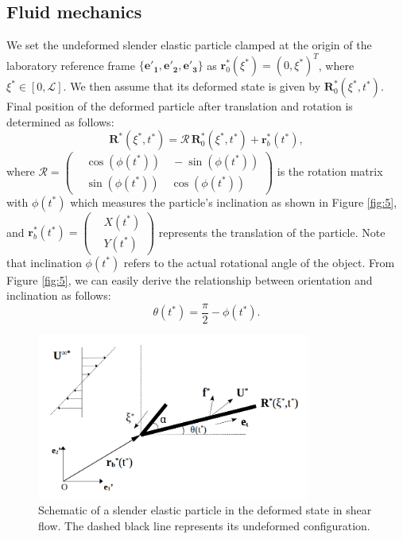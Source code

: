 \documentclass[a4paper,12pt]{report}
\begin{document}
\subsection{Fluid mechanics}
We set the undeformed slender elastic particle clamped at the origin of the laboratory reference frame $\{\mathbf{e'_1}, \mathbf{e'_2}, \mathbf{e'_3}\}$ as
$\mathbf{r}_0^*(\xi^*)=(0,\xi^*)^T$, where $\xi^*\in [0,\mathcal{L}]$. We then assume that its deformed state is given by $\mathbf{R}_0^*(\xi^*,t^*)$. 
Final position of the deformed particle after translation and rotation is determined as follows:
\begin{equation}
	\label{eqn:19}
	\mathbf{R}^*(\xi^*,t^*)=\mathbf{\mathcal{R}}\,\mathbf{R}_0^*(\xi^*,t^*)+\mathbf{r}_b^*(t^*),
\end{equation}
where $\mathbf{\mathcal{R}}=\left(\begin{aligned}
	&\cos(\phi(t^*))\quad -\sin(\phi(t^*)) \\
	&\sin(\phi(t^*))\quad \cos(\phi(t^*))
\end{aligned}\right)$ is the rotation matrix with $\phi(t^*)$ which measures the particle's inclination as shown in Figure \ref{fig:5}, and $\mathbf{r}_b^*(t^*)=\left(\begin{aligned}
&X(t^*) \\
&Y(t^*)
\end{aligned}\right)$ represents the translation of the particle. Note that inclination $\phi(t^*)$ refers to the actual rotational angle of the object. From Figure \ref{fig:5}, we can easily derive the relationship between orientation and inclination as follows:
\begin{equation}
	\label{eqn:20}
	\theta(t^*)=\frac{\pi}{2}-\phi(t^*).
\end{equation}
\begin{figure}[htb]
	\begin{center}
		\includegraphics[width=0.8\textwidth]{plot/rigid_case/schematic_rigid_configuration_color0_old.png}
		\caption{Schematic of a slender elastic particle in the deformed state in shear flow. The dashed black line represents its undeformed configuration.}
		\label{fig:23}
	\end{center}
\end{figure}
\end{document}

